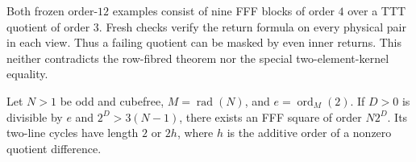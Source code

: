 Both frozen order-$12$ examples consist of nine FFF blocks of order $4$
over a TTT quotient of order $3$. Fresh checks verify the return formula
on every physical pair in each view. Thus a failing quotient can be
masked by even inner returns. This neither contradicts the row-fibred
theorem nor the special two-element-kernel equality.

\begin{theorem}
\label{thm:cubefree-crt}
Let $N>1$ be odd and cubefree, $M=\operatorname{rad}(N)$, and
$e=\operatorname{ord}_M(2)$. If $D>0$ is divisible by $e$ and
$2^D>3(N-1)$, there exists an FFF square of order $N2^D$.
Its two-line cycles have length $2$ or $2h$, where $h$ is the additive
order of a nonzero quotient difference.
\end{theorem}


